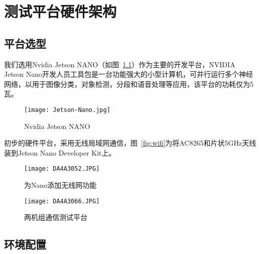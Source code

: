 \chapter{测试平台硬件架构}
\label{cha:Hardware}

\section{平台选型}

我们选用Nvidia Jetson NANO（如图~\ref{fig:Jetson-Nano}）作为主要的开发平台，NVIDIA Jetson Nano开发人员工具包是一台功能强大的小型计算机，可并行运行多个神经网络，以用于图像分类，对象检测，分段和语音处理等应用，该平台的功耗仅为5瓦。

\begin{figure}[htbp] %
    \centering
    \texttt{[image: Jetson-Nano.jpg]}
    \caption{Nvidia Jetson NANO}
    \label{fig:Jetson-Nano}
\end{figure}

初步的硬件平台，采用无线局域网通信，图~\ref{fig:wifi}为将AC8265和片状5GHz天线装到Jetson Nano Developer Kit上。

\begin{figure}[htbp]
    \begin{minipage}{0.48\textwidth}
      \centering
      \texttt{[image: DA4A3052.JPG]}
      \caption{为Nano添加无线网功能}
      \label{fig:wifi}
    \end{minipage}\hfill
    \begin{minipage}{0.48\textwidth}
      \centering
      \texttt{[image: DA4A3066.JPG]}
      \caption{两机组通信测试平台}
      \label{fig:two-setup}
    \end{minipage}
\end{figure}


\section{环境配置}